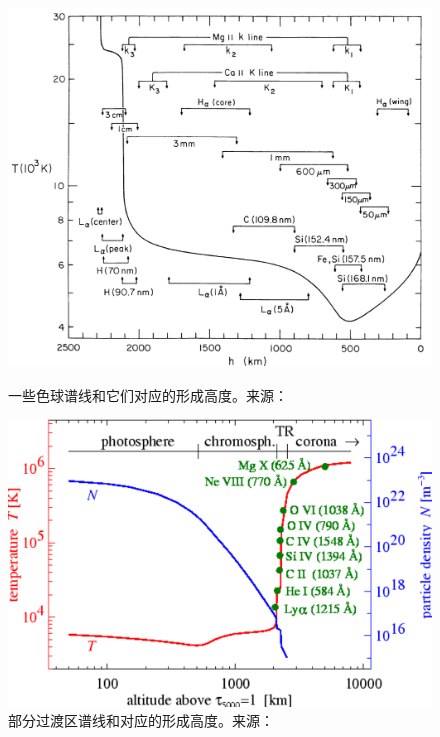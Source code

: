 \begin{figure}[htbp]
	\begin{minipage}[t]{0.5\linewidth}
	\centering
	\includegraphics[width=0.95\linewidth]{figs/fig8}
	\caption{一些色球谱线和它们对应的形成高度。来源：\textcite{Vernazza1981}}
	\label{fig:8}
	\end{minipage}%
	\hfill
	\begin{minipage}[t]{0.5\linewidth}
	\centering
	\includegraphics[width=0.95\linewidth]{figs/fig9}
	\caption{部分过渡区谱线和对应的形成高度。来源：\textcite{Peter2004}}
	\label{fig:9}
	\end{minipage}
\end{figure}
